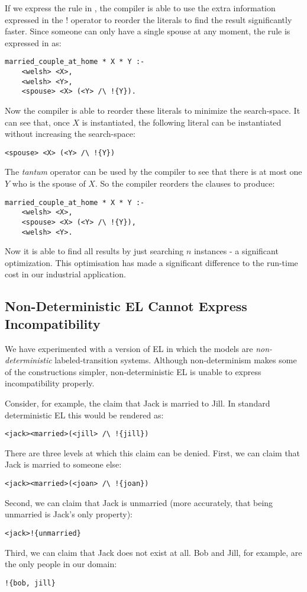 If we express the rule in \ELFULL{}, the compiler is able to use the extra information expressed in the $!$ operator to reorder the literals to find the result significantly faster.
Since someone can only have a single spouse at any moment, the rule is expressed in \ELFULL{} as:
\begin{verbatim}
married_couple_at_home * X * Y :-
    <welsh> <X>,
    <welsh> <Y>,
    <spouse> <X> (<Y> /\ !{Y}).
\end{verbatim}	
Now the compiler is able to reorder these literals to minimize the search-space. 
It can see that, once $X$ is instantiated, the following literal can be instantiated without increasing the search-space:
\begin{verbatim}
<spouse> <X> (<Y> /\ !{Y})
\end{verbatim}
The \emph{tantum} operator can be used by the compiler to see that there is at most one $Y$ who is the spouse of $X$.
So the compiler reorders the clauses to produce:
\begin{verbatim}
married_couple_at_home * X * Y :-
    <welsh> <X>,
    <spouse> <X> (<Y> /\ !{Y}),
    <welsh> <Y>.
\end{verbatim}	
Now it is able to find all results by just searching $n$ instances - a significant optimization.
This optimisation has made a significant difference to the run-time cost in our industrial application.


\subsection{Non-Deterministic EL Cannot Express Incompatibility}

We have experimented with a version of EL in which the models are \emph{non-deterministic} labeled-transition systems.
Although non-determinism makes some of the constructions simpler, non-deterministic EL is unable to express incompatibility properly.

Consider, for example, the claim that Jack is married to Jill. 
In standard deterministic EL this would be rendered as:
\begin{verbatim}
<jack><married>(<jill> /\ !{jill})
\end{verbatim}
There are three levels at which this claim can be denied.
First, we can claim that Jack is married to someone else:
\begin{verbatim}
<jack><married>(<joan> /\ !{joan})
\end{verbatim}
Second, we can claim that Jack is unmarried (more accurately, that being unmarried is Jack's only property):
\begin{verbatim}
<jack>!{unmarried}
\end{verbatim}
Third, we can claim that Jack does not exist at all. Bob and Jill, for example, are the only people in our domain:
\begin{verbatim}
!{bob, jill}
\end{verbatim}

